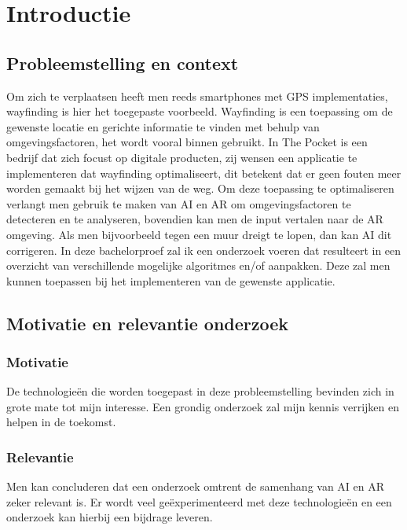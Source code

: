 \section{Introductie} %
\label{sec:introductie}
\subsection{Probleemstelling en context}
Om zich te verplaatsen heeft men reeds smartphones met GPS implementaties, wayfinding is hier het toegepaste voorbeeld. Wayfinding is een toepassing om de gewenste locatie en gerichte informatie te vinden met behulp van omgevingsfactoren, het wordt vooral binnen gebruikt. In The Pocket is een bedrijf dat zich focust op digitale producten, zij wensen een applicatie te implementeren dat wayfinding optimaliseert, dit betekent dat er geen fouten meer worden gemaakt bij het wijzen van de weg. 
Om deze toepassing te optimaliseren verlangt men gebruik te maken van AI en AR om omgevingsfactoren te detecteren en te analyseren, bovendien kan men de input vertalen naar de AR omgeving. Als men bijvoorbeeld tegen een muur dreigt te lopen, dan kan AI dit corrigeren.
In deze bachelorproef zal ik een onderzoek voeren dat resulteert in een overzicht van verschillende mogelijke algoritmes en/of aanpakken. Deze zal men kunnen toepassen bij het implementeren van de gewenste applicatie.

\subsection{Motivatie en relevantie onderzoek}
\subsubsection{Motivatie}
De technologieën die worden toegepast in deze probleemstelling bevinden zich in grote mate tot mijn interesse. Een grondig onderzoek zal mijn kennis verrijken en helpen in de toekomst. 
\subsubsection{Relevantie}
Men kan concluderen dat een onderzoek omtrent de samenhang van AI en AR  zeker relevant is. Er wordt veel geëxperimenteerd met deze technologieën en een onderzoek kan hierbij een bijdrage leveren.


